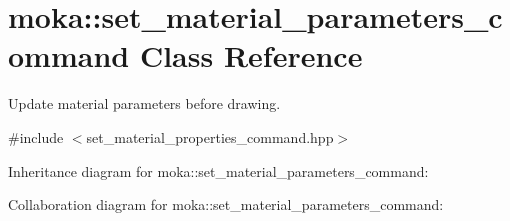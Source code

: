 \hypertarget{classmoka_1_1set__material__parameters__command}{}\section{moka\+::set\+\_\+material\+\_\+parameters\+\_\+command Class Reference}
\label{classmoka_1_1set__material__parameters__command}


Update material parameters before drawing.  




{\ttfamily \#include $<$set\+\_\+material\+\_\+properties\+\_\+command.\+hpp$>$}



Inheritance diagram for moka\+::set\+\_\+material\+\_\+parameters\+\_\+command\+:


Collaboration diagram for moka\+::set\+\_\+material\+\_\+parameters\+\_\+command\+:
